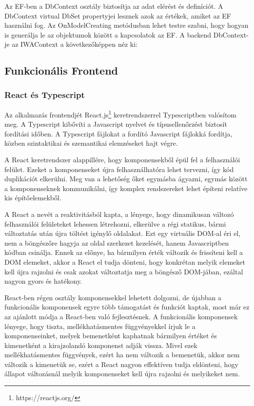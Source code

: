 Az EF-ben a DbContext osztály biztosítja az adat elérést és definíciót. A DbContext virtual DbSet propertyjei lesznek azok az értékek, amiket az EF használni fog. Az OnModelCreating metódusban lehet testre szabni, hogy hogyan is generálja le az objektumok között a kapcsolatok az EF. A backend DbContext-je az IWAContext a következőképpen néz ki:



\subsection{Funkcionális Frontend}
\subsubsection{React és Typescript}

Az alkalmazás frontendjét React.js\footnote{https://reactjs.org/} keretrendszerrel Typescriptben valósítom meg. A Typescript kibővíti a Javascript nyelvet és típusellenőrzést biztosít fordítási időben. A Typescript fájlokat a fordító Javascript fájlokká fordítja, közben szintaktikai és szemantikai elemzéseket hajt végre.

A React keretrendszer alappillére, hogy komponensekből épül fel a felhasználói felület. Ezeket a komponenseket újra felhasználhatóra lehet tervezni, így kód duplikációt elkerülni. Meg van a lehetőség őket egymásba ágyazni, egymás között a komponenseknek kommunikálni, így komplex rendszereket lehet építeni relatíve kis építőelemekből.

A React a nevét a reaktivitásból kapta, a lényege, hogy dinamikusan változó felhasználói felületeket lehessen létrehozni, elkerülve a régi statikus, bármi változtatás után újra töltést igénylő oldalakat. Ezt egy virtuális DOM-al éri el, nem a böngészőre hagyja az oldal szerkezet kezelését, hanem Javascriptben kódban csinálja. Ennek az előnye, ha bármilyen érték változik és frissíteni kell a DOM elemeket, akkor a React el tudja dönteni, hogy konkrétan melyik elemeket kell újra rajzolni és csak azokat változtatja meg a böngésző DOM-jában, ezáltal nagyon gyors és hatékony.

React-ben régen osztály komponensekkel lehetett dolgozni, de újabban a funkcionális komponensek egyre több támogatást és funkciót kaptak, most már ez az ajánlott módja a React-ben való fejlesztésnek. A funkcionális komponensek lényege, hogy tiszta, mellékhatásmentes függvényekkel írjuk le a komponenseinket, melyek bemenetként kaphatnak bármilyen értéket és kimenetként a kirajzolandó komponenst adják vissza. Mivel ezek mellékhatásmentes függvények, ezért ha nem változik a bemenetük, akkor nem változik a kimenetük se, ezért a React nagyon effektíven tudja eldönteni, hogy állapot változásnál melyik komponenseket kell újra rajzolni és melyikeket nem.

